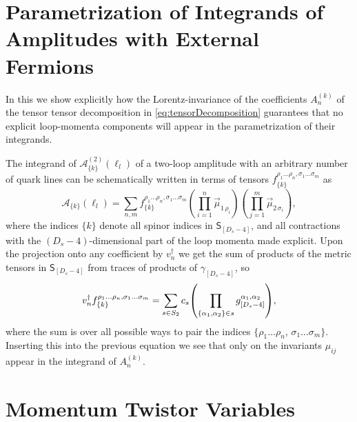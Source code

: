 \chapter{Parametrization of Integrands of Amplitudes with External Fermions}
\label{sec:ParamIntegrands}

In this  we show
explicitly how the Lorentz-invariance of the coefficients $A_n^{(k)}$ of the
tensor tensor decomposition in \cref{eq:tensorDecomposition} guarantees that
no explicit loop-momenta components will appear in the parametrization of their integrands.


The integrand of $\mathcal{A}^{(2)}_{\{k\}}(\ell_l)$ of a two-loop amplitude with an arbitrary
number of quark lines can be schematically written in terms of tensors $f^{\rho_1 \ldots \rho_n, \sigma_1\ldots \sigma_m}_{\{k\}}$ as
\begin{equation} 
  \mathcal{A}_{\{k\}}(\ell_l) = \sum_{n,m} f^{\rho_1 \ldots \rho_n, \sigma_1 \ldots \sigma_m}_{\{k\}}
  \left(\prod_{i=1}^n \vec{\mu}_{1 \, \rho_i}\right)
  \left(\prod_{j=1}^m \vec{\mu}_{2 \, \sigma_i}\right),
\end{equation}
where the indices $\{k\}$ denote all spinor indices in  $\mathsf{S}_{[D_s-4]}$,
and all contractions with the $(D_s-4)$-dimensional part of the loop momenta made explicit.
Upon the projection onto any coefficient by $v_n^\dagger$ we get the sum of products of the metric tensors in $\mathsf{S}_{[D_s-4]}$
from traces of products of $\gamma_{[D_s-4]}$, so 
\begin{equation}
  v_n^\dagger f^{\rho_1 \ldots \rho_n, \sigma_1 \ldots \sigma_m}_{\{k\}}  = \sum_{s\in S_2} c_s \qty(\prod_{\{\alpha_1,\alpha_2\}\in s} g^{\alpha_1,\alpha_2}_{[D_s-4]}),
\end{equation}
where the sum is over all possible ways to pair the indices $\{ \rho_1 \ldots \rho_n,\,\sigma_1 \ldots \sigma_m \}$.
Inserting this into the previous equation we see that only on the invariants $\mu_{ij}$ appear in the integrand of $A_n^{(k)}$.



\chapter{Momentum Twistor Variables}
\label{sec:twistors}

